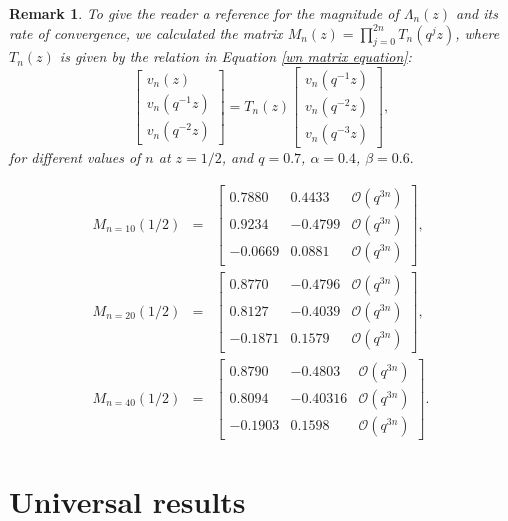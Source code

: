 \documentclass[a4paper,reqno]{amsart}
\numberwithin{equation}{section}
\newtheorem{remark}[theorem]{Remark}
\numberwithin{figure}{section}
\begin{document}
\begin{remark}
    To give the reader a reference for the magnitude of $\Lambda_n(z)$ and its rate of convergence, we calculated the matrix $M_n(z) = \prod_{j=0}^{2n} T_n(q^jz)$, where $T_n(z)$ is given by the relation in Equation \eqref{wn matrix equation}:
\begin{equation}\nonumber 
   \begin{bmatrix}
   v_n(z)\\
   v_n(q^{-1}z)\\
   v_n(q^{-2}z)
 \end{bmatrix}= T_n(z)
 \begin{bmatrix}
   v_n(q^{-1}z)\\
   v_n(q^{-2}z)\\
   v_n(q^{-3}z)
 \end{bmatrix},
 \end{equation}
 for different values of $n$ at $z=1/2$, and $q=0.7$, $\alpha= 0.4$, $\beta = 0.6.$
\end{remark}

\begin{eqnarray*}
    M_{n=10}(1/2) &=& \begin{bmatrix}
   0.7880&0.4433&\mathcal{O}(q^{3n})\\
   0.9234&-0.4799&\mathcal{O}(q^{3n})\\
   -0.0669&0.0881&\mathcal{O}(q^{3n})
 \end{bmatrix},\\
 M_{n=20}(1/2) &=& \begin{bmatrix}
   0.8770&-0.4796&\mathcal{O}(q^{3n})\\
   0.8127&-0.4039&\mathcal{O}(q^{3n})\\
  -0.1871&0.1579&\mathcal{O}(q^{3n})
 \end{bmatrix},\\
 M_{n=40}(1/2) &=& \begin{bmatrix}
   0.8790&-0.4803&\mathcal{O}(q^{3n})\\
   0.8094&-0.40316&\mathcal{O}(q^{3n})\\
  -0.1903&0.1598&\mathcal{O}(q^{3n})
 \end{bmatrix}.
\end{eqnarray*} 

\section{Universal results}\label{Uni section}
\end{document}
